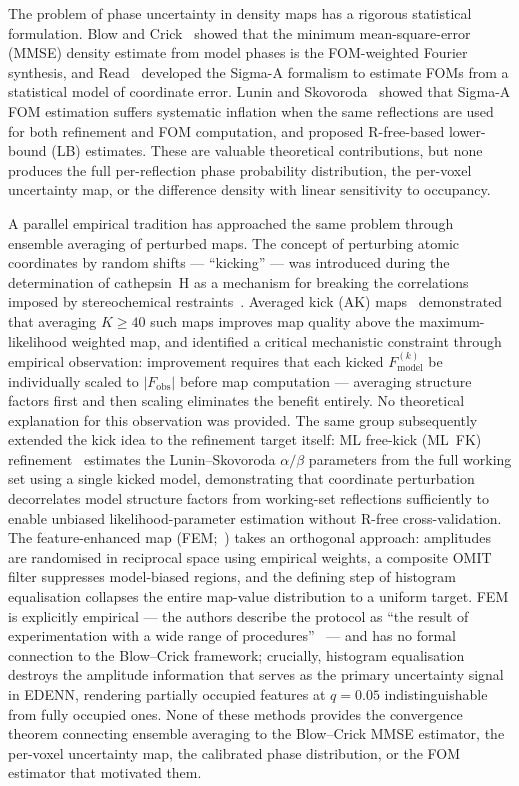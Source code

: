 \documentclass[10pt,twocolumn]{article}
\begin{document}
The problem of phase uncertainty in density maps has a rigorous
statistical formulation.  Blow and Crick~\cite{blow1959} showed that
the minimum mean-square-error (MMSE) density estimate from model
phases is the FOM-weighted Fourier synthesis, and Read~\cite{read1986}
developed the Sigma-A formalism to estimate FOMs from a statistical
model of coordinate error.  Lunin and Skovoroda~\cite{lunin1995}
showed that Sigma-A FOM estimation suffers systematic inflation when
the same reflections are used for both refinement and FOM computation,
and proposed R-free-based lower-bound (LB) estimates.  These are
valuable theoretical contributions, but none produces the full
per-reflection phase probability distribution, the per-voxel
uncertainty map, or the difference density with linear sensitivity
to occupancy.

A parallel empirical tradition has approached the same problem through
ensemble averaging of perturbed maps.
The concept of perturbing atomic coordinates by random shifts ---
``kicking'' --- was introduced during the determination of cathepsin~H
as a mechanism for breaking the correlations imposed by stereochemical
restraints~\cite{guncar2000}.
Averaged kick (AK) maps~\cite{praznk2009} demonstrated that averaging
$K \geq 40$ such maps improves map quality above the maximum-likelihood
weighted map, and identified a critical mechanistic
constraint through empirical observation: improvement requires that
each kicked $F_\mathrm{model}^{(k)}$ be individually scaled to
$|F_\mathrm{obs}|$ before map computation --- averaging structure
factors first and then scaling eliminates the benefit entirely.
No theoretical explanation for this observation was provided.
The same group subsequently extended the kick idea to the refinement
target itself: ML free-kick (ML~FK) refinement~\cite{praznk2014}
estimates the Lunin--Skovoroda $\alpha/\beta$ parameters from the
full working set using a single kicked model, demonstrating that
coordinate perturbation decorrelates model structure factors from
working-set reflections sufficiently to enable unbiased
likelihood-parameter estimation without R-free cross-validation.
The feature-enhanced map (FEM;~\cite{afonine2015}) takes an orthogonal
approach: amplitudes are randomised in reciprocal space using
empirical weights, a composite OMIT filter suppresses model-biased
regions, and the defining step of histogram equalisation collapses
the entire map-value distribution to a uniform target.
FEM is explicitly empirical --- the authors describe the protocol as
``the result of experimentation with a wide range of
procedures''~\cite{afonine2015} --- and has no formal connection to
the Blow--Crick framework; crucially, histogram equalisation
destroys the amplitude information that serves as the primary
uncertainty signal in EDENN, rendering partially occupied features
at $q=0.05$ indistinguishable from fully occupied ones.
None of these methods provides the convergence theorem connecting
ensemble averaging to the Blow--Crick MMSE estimator, the per-voxel
uncertainty map, the calibrated phase distribution, or the FOM
estimator that motivated them.
\end{document}
